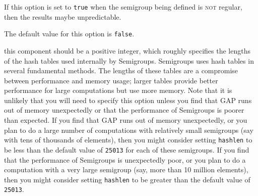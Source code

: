 \documentclass[a4paper,11pt]{report}
\begin{document}
{{\begin{description}
 If this option is set to \texttt{true} when the semigroup being defined is \textsc{not} regular, then the results maybe unpredictable. 

 The default value for this option is \texttt{false}. 
\item[{\texttt{hashlen}}]  this component should be a positive integer, which roughly specifies the
lengths of the hash tables used internally by \textsf{Semigroups}. \textsf{Semigroups} uses hash tables in several fundamental methods. The lengths of these tables
are a compromise between performance and memory usage; larger tables provide
better performance for large computations but use more memory. Note that it is
unlikely that you will need to specify this option unless you find that \textsf{GAP} runs out of memory unexpectedly or that the performance of \textsf{Semigroups} is poorer than expected. If you find that \textsf{GAP} runs out of memory unexpectedly, or you plan to do a large number of
computations with relatively small semigroups (say with tens of thousands of
elements), then you might consider setting \texttt{hashlen} to be less than the default value of \texttt{25013} for each of these semigroups. If you find that the performance of \textsf{Semigroups} is unexpectedly poor, or you plan to do a computation with a very large
semigroup (say, more than 10 million elements), then you might consider
setting \texttt{hashlen} to be greater than the default value of \texttt{25013}. 


\end{description}}}
\end{document}
